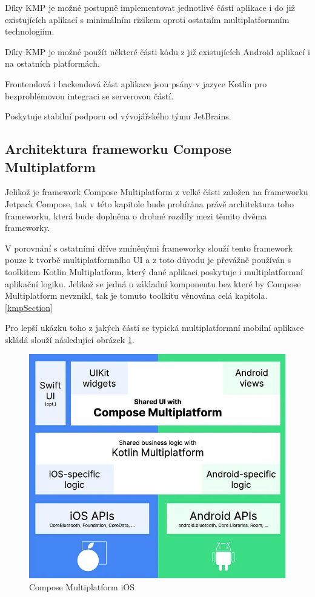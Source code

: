Díky KMP je možné postupně implementovat jednotlivé částí aplikace i do již existujících aplikací s minimálním rizikem oproti
ostatním multiplatformním technologiím. \cite{KMP}

Díky KMP je možné použít některé části kódu z již existujících Android aplikací i na ostatních platformách.

Frontendová i backendová část aplikace jsou psány v jazyce Kotlin pro bezproblémovou integraci se serverovou částí.

Poskytuje stabilní podporu od vývojářského týmu JetBrains.

\subsection*{Architektura frameworku Compose Multiplatform}
Jelikož je framework Compose Multiplatform z velké části založen na frameworku Jetpack Compose, tak v této kapitole bude probírána
právě architektura toho frameworku, která bude doplněna o drobné rozdíly mezi těmito dvěma frameworky.

V porovnání s ostatními dříve zmíněnými frameworky slouží tento framework pouze k tvorbě multiplatformního UI a z toto důvodu je převážně 
používán s toolkitem Kotlin Multiplatform, který dané aplikaci poskytuje i multiplatformní aplikační logiku. Jelikož se jedná o základní 
komponentu bez které by Compose Multiplatform nevznikl, tak je tomuto toolkitu věnována celá kapitola. \ref{kmpSection}

Pro lepší ukázku toho z jakých částí se typická multiplatformní mobilní aplikace skládá slouží následující obrázek \ref{fig:composeIOS}.

\begin{figure}[H]
  \centering
  \includegraphics[width=.7\textwidth]{composeIOS.png}
  \caption{Compose Multiplatform iOS}
  \label{fig:composeIOS}
\end{figure}

